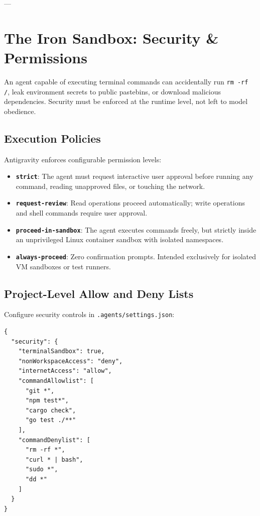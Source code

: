 \documentclass[11pt,a4paper,oneside]{book}
\begin{document}
---

\chapter{The Iron Sandbox: Security \& Permissions}

\begin{cautionbox}
An agent capable of executing terminal commands can accidentally run \texttt{rm -rf /}, leak environment secrets to public pastebins, or download malicious dependencies. Security must be enforced at the runtime level, not left to model obedience.
\end{cautionbox}

\section{Execution Policies}
Antigravity enforces configurable permission levels:
\begin{itemize}
    \item \textbf{\texttt{strict}}: The agent must request interactive user approval before running any command, reading unapproved files, or touching the network.
    \item \textbf{\texttt{request-review}}: Read operations proceed automatically; write operations and shell commands require user approval.
    \item \textbf{\texttt{proceed-in-sandbox}}: The agent executes commands freely, but strictly inside an unprivileged Linux container sandbox with isolated namespaces.
    \item \textbf{\texttt{always-proceed}}: Zero confirmation prompts. Intended exclusively for isolated VM sandboxes or test runners.
\end{itemize}

\section{Project-Level Allow and Deny Lists}
Configure security controls in \texttt{.agents/settings.json}:
\begin{lstlisting}[caption={Hardening Antigravity security policies}]
{
  "security": {
    "terminalSandbox": true,
    "nonWorkspaceAccess": "deny",
    "internetAccess": "allow",
    "commandAllowlist": [
      "git *",
      "npm test*",
      "cargo check",
      "go test ./**"
    ],
    "commandDenylist": [
      "rm -rf *",
      "curl * | bash",
      "sudo *",
      "dd *"
    ]
  }
}
\end{lstlisting}
\end{document}
